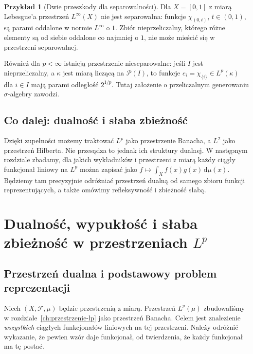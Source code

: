 \documentclass[11pt,a4paper,oneside]{book}
\numberwithin{equation}{chapter}
\theoremstyle{plain}
\theoremstyle{definition}
\newtheorem{przyklad}[twierdzenie]{Przykład}
\theoremstyle{remark}
\begin{document}
\begin{przyklad}[Dwie przeszkody dla separowalności]
Dla $X=[0,1]$ z miarą Lebesgue'a przestrzeń
$L^\infty(X)$ nie jest separowalna: funkcje
$\chi_{(0,t)}$, $t\in(0,1)$, są parami
oddalone w normie $L^\infty$ o $1$.
Zbiór nieprzeliczalny, którego różne elementy są
od siebie oddalone co najmniej o $1$, nie może
mieścić się w przestrzeni separowalnej.

Również dla $p<\infty$ istnieją przestrzenie
nieseparowalne: jeśli $I$ jest nieprzeliczalny,
a $\kappa$ jest miarą liczącą na $\mathcal P(I)$,
to funkcje $e_i=\chi_{\{i\}}\in L^p(\kappa)$
dla $i\in I$ mają parami odległość $2^{1/p}$.
Tutaj założenie o przeliczalnym generowaniu
$\sigma$-algebry zawodzi.
\end{przyklad}

\section{Co dalej: dualność i słaba zbieżność}
Dzięki zupełności możemy traktować $L^p$ jako
przestrzenie Banacha, a $L^2$ jako przestrzeń Hilberta.
Nie przesądza to jednak ich struktury dualnej.
W następnym rozdziale zbadamy, dla jakich
wykładników i przestrzeni z miarą każdy ciągły
funkcjonał liniowy na $L^p$ można zapisać jako
$f\mapsto\int_Xf(x)g(x)\,\mathrm d\mu(x)$.
Będziemy tam precyzyjnie odróżniać
przestrzeń dualną od samego zbioru funkcji reprezentujących,
a także omówimy refleksywność i zbieżność słabą.



\chapter[Dualność i geometria przestrzeni $L^p$]{Dualność, wypukłość i słaba zbieżność w przestrzeniach $L^p$}
\label{ch:dualnosc-lp}

\section{Przestrzeń dualna i podstawowy problem reprezentacji}
Niech $(X,\mathcal F,\mu)$ będzie przestrzenią z miarą. Przestrzeń
$L^p(\mu)$ zbudowaliśmy w rozdziale~\ref{ch:przestrzenie-lp} jako
przestrzeń Banacha. Celem jest znalezienie \emph{wszystkich} ciągłych
funkcjonałów liniowych na tej przestrzeni. Należy odróżnić
wykazanie, że pewien wzór daje funkcjonał, od twierdzenia, że
każdy funkcjonał ma tę postać.
\end{document}
